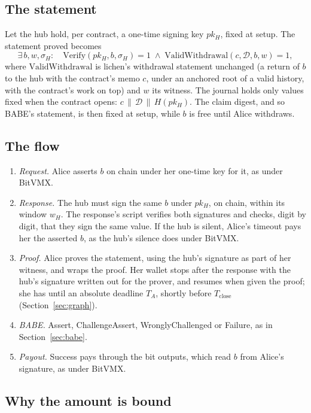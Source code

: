 \documentclass[11pt]{article}
\newcommand{\Tc}{T_{\mathrm{close}}}
\begin{document}
\subsection{The statement}

Let the hub hold, per contract, a one-time signing key $pk_H$, fixed at
setup. The statement proved becomes
\[
  \exists\, b, w, \sigma_H:\quad
  \mathrm{Verify}(pk_H, b, \sigma_H) = 1 \;\wedge\;
  \mathrm{ValidWithdrawal}(c, \mathcal{D}, b, w) = 1,
\]
where $\mathrm{ValidWithdrawal}$ is lichen's withdrawal statement
unchanged (a return of $b$ to the hub with the contract's memo $c$, under
an anchored root of a valid history, with the contract's work on top)
and $w$ its witness. The journal holds only values fixed when the
contract opens: $c \,\|\, \mathcal{D} \,\|\, H(pk_H)$. The claim digest, and
so BABE's statement, is then fixed at setup, while $b$ is free until
Alice withdraws.

\subsection{The flow}

\begin{enumerate}[leftmargin=1.5em]
\item \emph{Request.} Alice asserts $b$ on chain under her one-time key
  for it, as under BitVMX.
\item \emph{Response.} The hub must sign the same $b$ under $pk_H$, on
  chain, within its window $w_H$. The response's script verifies both
  signatures and checks, digit by digit, that they sign the same value.
  If the hub is silent, Alice's timeout pays her the asserted $b$, as
  the hub's silence does under BitVMX.
\item \emph{Proof.} Alice proves the statement, using the hub's
  signature as part of her witness, and wraps the proof. Her wallet
  stops after the response with the hub's signature written out for the
  prover, and resumes when given the proof; she has until an absolute
  deadline $T_A$, shortly before $\Tc$ (Section~\ref{sec:graph}).
\item \emph{BABE.} Assert, ChallengeAssert, WronglyChallenged or
  Failure, as in Section~\ref{sec:babe}.
\item \emph{Payout.} Success pays through the bit outputs, which read
  $b$ from Alice's signature, as under BitVMX.
\end{enumerate}

\subsection{Why the amount is bound}
\label{sec:binding}
\end{document}
